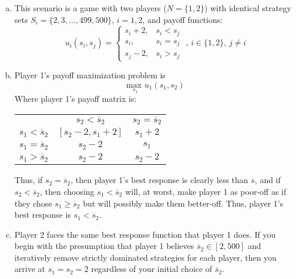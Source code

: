 \documentclass{article}
\newcommand{\usmax}[1]{\underset{#1}{\text{max }}}
\begin{document}
\begin{enumerate}[(a)]
	\item This scenario is a game with two players ($N=\{1,2\}$) with identical strategy sets ${S_i=\{2,3,...,499,500\}}$, $i=1,2$, and payoff functions:
		\[
			u_i(s_i,s_j) = \begin{cases} s_i + 2, & s_i<s_j \\ s_i, & s_i = s_j \\ s_j - 2, & s_i>s_j \end{cases}\text{ , }i\in\{1,2\}\text{, }j\neq i
		\]
		
	\item Player 1's payoff maximization problem is 
		\[
			\usmax{s_1}u_1(s_1,s_2)
		\]
		Where player 1's payoff matrix is:
		\begin{center}
			\begin{tabular}{rcc}
									& $s_2 < \overline{s}_2$						& $s_2 = \overline{s}_2$			\\ \cline{2-3} 
			$s_1 < \overline{s}_2$	& \multicolumn{1}{|c|}{$[s_2 -2, s_1 + 2]$}		& \multicolumn{1}{|c|}{$s_1 + 2$}	\\ \cline{2-3}
			$s_1 = \overline{s}_2$	& \multicolumn{1}{|c|}{$s_2 - 2$}				& \multicolumn{1}{|c|}{$s_1$}		\\ \cline{2-3}
			$s_1 > \overline{s}_2$	& \multicolumn{1}{|c|}{$s_2 - 2$}				& \multicolumn{1}{|c|}{$s_2 - 2$}	\\ \cline{2-3}
			\end{tabular}
		\end{center}
		Thus, if $s_2=\overline{s}_2$, then player 1's best response is clearly less than $\overline{s}$, and if $s_2<\overline{s}_2$, then choosing $s_1<\overline{s}_2$ will, at worst, make player 1 as poor-off as if they chose $s_1\geq\overline{s}_2$ but will possibly make them better-off. Thus, player 1's best response is $s_1<\overline{s}_2$.
	
	\item Player 2 faces the same best response function that player 1 does. If you begin with the presumption that player 1 believes $\overline{s}_2\in[2,500]$ and iteratively remove strictly dominated strategies for each player, then you arrive at $s_1=s_2=2$ regardless of your initial choice of $\overline{s}_2$.
	
\end{enumerate}


\end{document}
